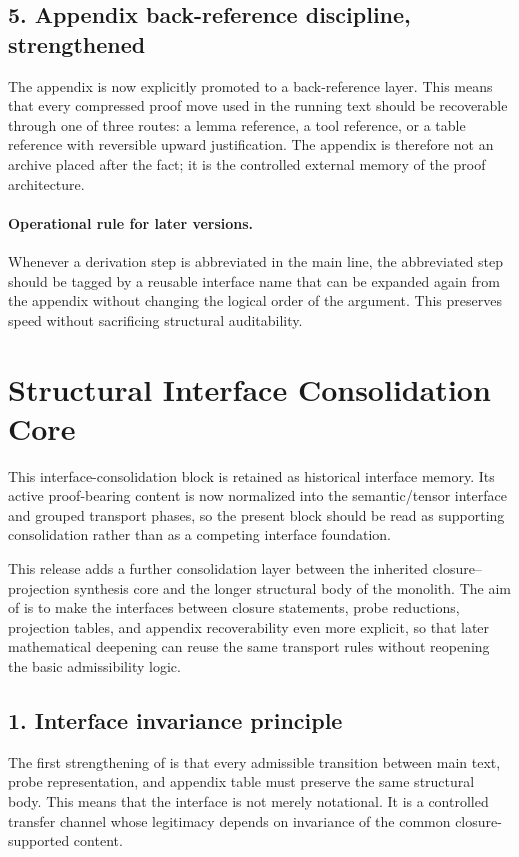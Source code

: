 \subsection*{5. Appendix back-reference discipline, strengthened}
The appendix is now explicitly promoted to a back-reference layer. This means
that every compressed proof move used in the running text should be recoverable
through one of three routes: a lemma reference, a tool reference, or a table
reference with reversible upward justification. The appendix is therefore not an
archive placed after the fact; it is the controlled external memory of the proof
architecture.

\paragraph{Operational rule for later versions.}
Whenever a derivation step is abbreviated in the main line, the abbreviated step
should be tagged by a reusable interface name that can be expanded again from
the appendix without changing the logical order of the argument. This preserves
speed without sacrificing structural auditability.


\section*{ Structural Interface Consolidation Core}

\begin{remark}
\label{rem:normalization-note-v180}
This interface-consolidation block is retained as historical interface memory. Its active proof-bearing content is now normalized into the semantic/tensor interface and grouped transport phases, so the present block should be read as supporting consolidation rather than as a competing interface foundation.
\end{remark}

This release adds a further consolidation layer between the inherited closure--projection
synthesis core and the longer structural body of the monolith. The aim of
 is to make the interfaces between closure statements, probe reductions,
projection tables, and appendix recoverability even more explicit, so that later
mathematical deepening can reuse the same transport rules without reopening the
basic admissibility logic.

\subsection*{1. Interface invariance principle}
The first strengthening of  is that every admissible transition between
main text, probe representation, and appendix table must preserve the same
structural body. This means that the interface is not merely notational. It is a
controlled transfer channel whose legitimacy depends on invariance of the common
closure-supported content.


